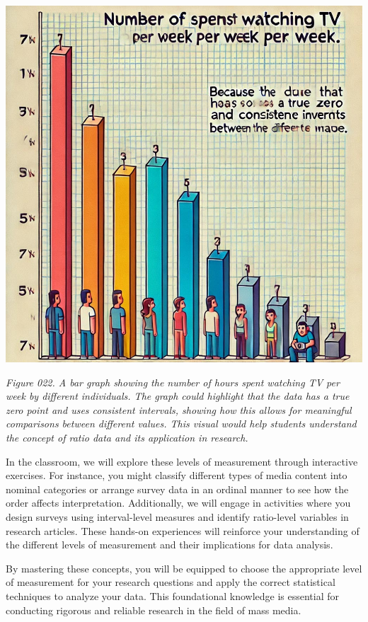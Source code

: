 \documentclass[
]{book}
\begin{document}
\includegraphics[width=1\linewidth,height=\textheight,keepaspectratio]{images/fig022.jpg}

\emph{Figure 022. A bar graph showing the number of hours spent watching TV per week by different individuals. The graph could highlight that the data has a true zero point and uses consistent intervals, showing how this allows for meaningful comparisons between different values. This visual would help students understand the concept of ratio data and its application in research.}

In the classroom, we will explore these levels of measurement through interactive exercises. For instance, you might classify different types of media content into nominal categories or arrange survey data in an ordinal manner to see how the order affects interpretation. Additionally, we will engage in activities where you design surveys using interval-level measures and identify ratio-level variables in research articles. These hands-on experiences will reinforce your understanding of the different levels of measurement and their implications for data analysis.

By mastering these concepts, you will be equipped to choose the appropriate level of measurement for your research questions and apply the correct statistical techniques to analyze your data. This foundational knowledge is essential for conducting rigorous and reliable research in the field of mass media.
\end{document}
